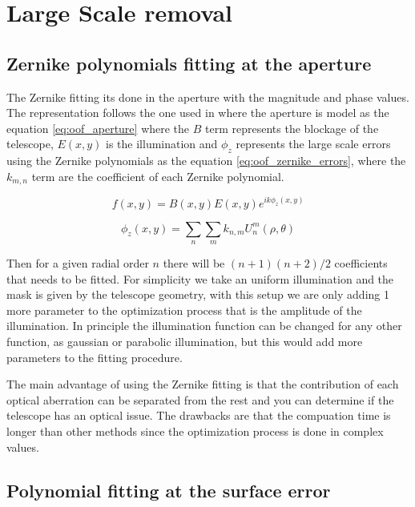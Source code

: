 \section{Large Scale removal}


\subsection{Zernike polynomials fitting at the aperture}
The Zernike fitting its done in the aperture with the magnitude and phase values. The representation follows the one used in \cite{cassanelli_oof} where the aperture is model as the equation \ref{eq:oof_aperture} where the $B$ term represents the blockage of the telescope, $E(x,y)$ is the illumination and $\phi_z$ represents the large scale errors using the Zernike polynomials as the equation \ref{eq:oof_zernike_errors}, where the $k_{m,n}$ term are the coefficient of each Zernike polynomial.




\begin{equation}
    f(x,y) = B(x,y)E(x,y)e^{i k \phi_z(x,y)}
    \label{eq:oof_aperture}
\end{equation}

\begin{equation}
    \phi_z(x,y) =  \sum_n \sum_m k_{n,m}U^{m}_{n}(\rho, \theta)
    \label{eq:oof_zernike_errors}
\end{equation}


Then for a given radial order $n$ there will be $(n+1)(n+2)/2$ coefficients that needs to be fitted. 
For simplicity we take an uniform illumination and the mask is given by the telescope geometry, with this setup we are only adding 1 more parameter to the optimization process that is the amplitude of the illumination. In principle the illumination function can be changed for any other function, as gaussian or parabolic illumination, but this would add more parameters to the fitting procedure.


The main advantage of using the Zernike fitting is that the contribution of each optical aberration can be separated from the rest and you can determine if the telescope has an optical issue. The drawbacks are that the compuation time is longer than other methods since the optimization process is done in complex values.

\subsection{Polynomial fitting at the surface error}

